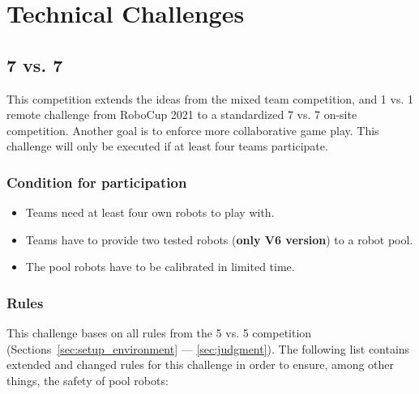 \section{Technical Challenges}

\subsection{7 vs. 7}
    This competition extends the ideas from the mixed team competition, and 1 vs. 1 remote challenge from RoboCup 2021 to a standardized 7 vs. 7 on-site competition. Another goal is to enforce more collaborative game play. This challenge will only be executed if at least four teams participate.

    \subsubsection{Condition for participation} %
    \label{sec:7vs7:condition_for_participation}
        \begin{itemize}
            \item Teams need at least four own robots to play with.
            \item Teams have to provide two tested robots (\textbf{only V6 version}) to a robot pool.
            \item The pool robots have to be calibrated in limited time.
        \end{itemize}

    \subsubsection{Rules}
        This challenge bases on all rules from the 5 vs. 5 competition (Sections~\ref{sec:setup_environment} — \ref{sec:judgment}). The following list contains extended and changed rules for this challenge in order to ensure, among other things, the safety of pool robots:

